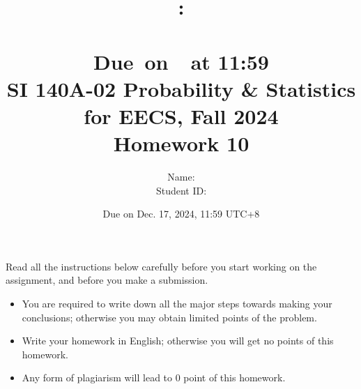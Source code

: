 \documentclass[a4paper]{article}
\title{
    \vspace{2in}
    \textmd{\textbf{\hmwkClass:\\  \hmwkTitle}}\\
    \normalsize\vspace{0.1in}\small{Due\ on\ \hmwkDueDate\ at 11:59}\\
	\vspace{4in}
}
\author{
	Name: \textbf{\hmwkAuthorName} \\
	Student ID: \hmwkAuthorID}
\date{}
\begin{document}

\date{
Due on Dec. 17, 2024, 11:59 UTC+8}
\title{SI 140A-02  Probability \& Statistics for EECS, Fall 2024 \\
Homework 10}
\maketitle
Read all the instructions below carefully before you start working on the assignment, and before you make a submission.
\begin{itemize}
    \item You are required to write down all the major steps towards making your conclusions; otherwise you may obtain limited points of the problem.
    \item Write your homework in English; otherwise you will get no points of this homework.
    \item Any form of plagiarism will lead to $0$ point of this homework. 
\end{itemize}
\newpage
\end{document}
